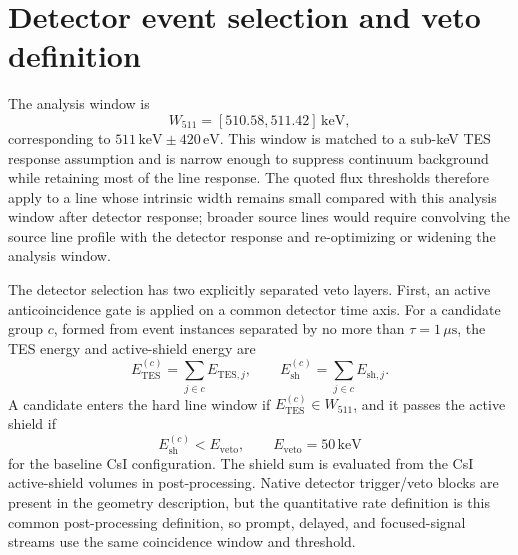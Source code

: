 \documentclass[preprint,12pt]{elsarticle}
\newcommand{\keV}{\,\mathrm{keV}}
\newcommand{\wii}{W_{511}}
\begin{document}
\section{Detector event selection and veto definition}
\label{sec:selection}

The analysis window is
\begin{equation}
  \wii = [510.58,511.42]\keV,
\end{equation}
corresponding to $511\keV\pm420\,\mathrm{eV}$. This window is matched to a sub-keV TES response assumption and is narrow enough to suppress continuum background while retaining most of the line response.
The quoted flux thresholds therefore apply to a line whose intrinsic width remains small compared with this analysis window after detector response; broader source lines would require convolving the source line profile with the detector response and re-optimizing or widening the analysis window.

The detector selection has two explicitly separated veto layers. First, an
active anticoincidence gate is applied on a common detector time axis. For a
candidate group $c$, formed from event instances separated by no more than
$\tau=1\,\mu\mathrm{s}$, the TES energy and active-shield energy are
\begin{equation}
  E_{\mathrm{TES}}^{(c)}=\sum_{j\in c}E_{\mathrm{TES},j},\qquad
  E_{\mathrm{sh}}^{(c)}=\sum_{j\in c}E_{\mathrm{sh},j}.
\end{equation}
A candidate enters the hard line window if $E_{\mathrm{TES}}^{(c)}\in\wii$,
and it passes the active shield if
\begin{equation}
  E_{\mathrm{sh}}^{(c)} < E_{\mathrm{veto}}, \qquad E_{\mathrm{veto}}=50\keV
\end{equation}
for the baseline CsI configuration. The shield sum is evaluated from the CsI
active-shield volumes in post-processing. Native detector trigger/veto blocks
are present in the geometry description, but the quantitative rate definition is
this common post-processing definition, so prompt, delayed, and focused-signal
streams use the same coincidence window and threshold.
\end{document}
